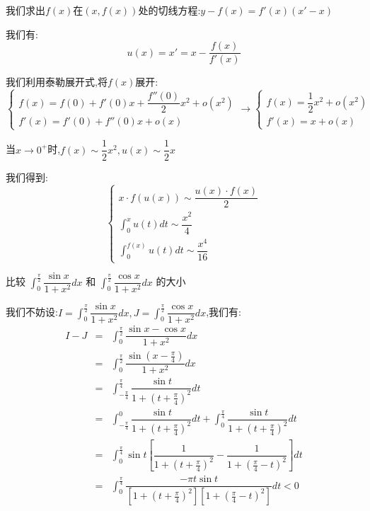 \begin{solution}

	我们求出$f(x)$在$(x,f(x))$处的切线方程:$y-f(x)=f'(x)(x'-x)$
	
	我们有:
	$$u(x)=x'=x-\dfrac{f(x)}{f'(x)}$$
	
	我们利用泰勒展开式,将$f(x)$展开:
	$$\left\lbrace 
	\begin{array}{l}
		f(x)=f(0)+f'(0)x+\dfrac{f''(0)}{2}x^2+o(x^2)\\
		f'(x)=f'(0)+f''(0)x+o(x)
	\end{array}
	\right. \to \left\lbrace 
	\begin{array}{l}
		f(x)=\dfrac{1}{2}x^2+o(x^2)\\
		f'(x)=x+o(x)
	\end{array}
	\right. $$
	
	当$x\to 0^{+}$时,$f(x)\sim \dfrac{1}{2}x^2,u(x)\sim \dfrac{1}{2}x$
	
	我们得到:
	$$\left\lbrace 
	\begin{array}{l}
		x\cdot f(u(x))\sim \dfrac{u(x)\cdot f(x)}{2}\\
		\int_{0}^{x}u(t)dt\sim \dfrac{x^2}{4}\\
		\int_{0}^{f(x)}u(t)dt\sim \dfrac{x^4}{16}
	\end{array}
	\right. $$
\end{solution}

\begin{example}[][Exam: 36.4.2]
	比较 $\int_{0}^{\frac{\pi}{2}}\dfrac{\sin x}{1+x^2}dx$ 和 $\int_{0}^{\frac{\pi}{2}}\dfrac{\cos x}{1+x^2}dx$ 的大小
\end{example}

\begin{solution}

	我们不妨设:$I=\int_{0}^{\frac{\pi}{2}}\dfrac{\sin x}{1+x^2}dx,J=\int_{0}^{\frac{\pi}{2}}\dfrac{\cos x}{1+x^2}dx$,我们有:
	\begin{eqnarray*}
		I-J&=&\int_{0}^{\frac{\pi}{2}}\dfrac{\sin x-\cos x}{1+x^2}dx\\
		&=&\int_{0}^{\frac{\pi}{2}}\dfrac{\sin(x-\frac{\pi}{4})}{1+x^2}dx\\
		&=&\int_{-\frac{\pi}{4}}^{\frac{\pi}{4}}\dfrac{\sin t}{1+(t+\frac{\pi}{4})^2}dt\\
		&=&\int_{-\frac{\pi}{4}}^{0}\dfrac{\sin t}{1+(t+\frac{\pi}{4})^2}dt+\int_{0}^{\frac{\pi}{4}}\dfrac{\sin t}{1+(t+\frac{\pi}{4})^2}dt\\
		&=&\int_{0}^{\frac{\pi}{4}}\sin t[\dfrac{1}{1+(t+\frac{\pi}{4})^2}-\dfrac{1}{1+(\frac{\pi}{4}-t)^2}]dt\\
		&=&\int_{0}^{\frac{\pi}{4}}\dfrac{-\pi t\sin t}{[1+(t+\frac{\pi}{4})^2][1+(\frac{\pi}{4}-t)^2]}dt<0
	\end{eqnarray*}
	
\end{solution}


